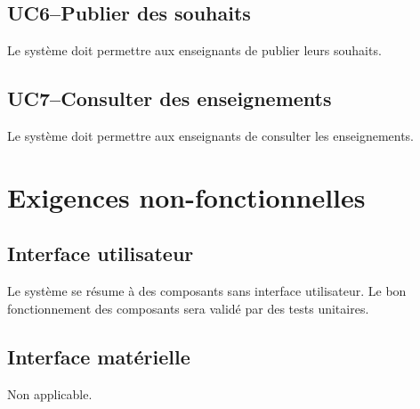 \subsection{UC6\---Publier des souhaits}
\begin{requirement}
	Le système doit permettre aux enseignants de publier leurs souhaits.
\end{requirement}

\subsection{UC7\---Consulter des enseignements}
\begin{requirement}
	Le système doit permettre aux enseignants de consulter les enseignements.
\end{requirement}

\section{Exigences non-fonctionnelles}\label{section:non-fonctionnelles}
	\subsection{Interface utilisateur}
Le système se résume à des composants sans interface utilisateur. 
Le bon fonctionnement des composants sera validé par des tests unitaires.

	\subsection{Interface matérielle}
Non applicable.

